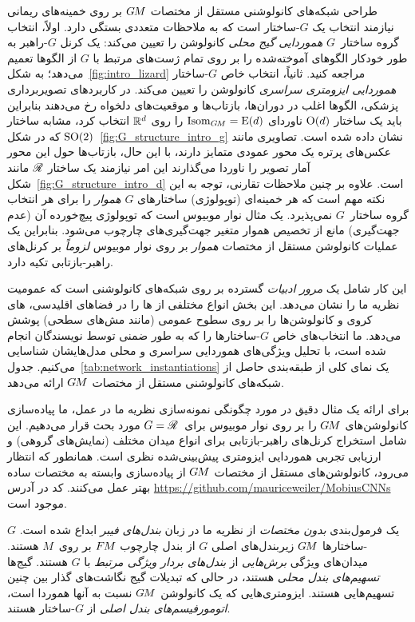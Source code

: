 طراحی شبکه‌های کانولوشنی مستقل از مختصات $G\mkern-1.4muM$ بر روی خمینه‌های ریمانی نیازمند انتخاب یک $G$-ساختار است که به ملاحظات متعددی بستگی دارد.
اولاً، انتخاب گروه ساختار~$G$ \emph{هموردایی گیج محلی} کانولوشن را تعیین می‌کند:
یک کرنل $G$-راهبر به طور خودکار الگوهای آموخته‌شده را بر روی تمام ژست‌های مرتبط با $G$ از الگوها تعمیم می‌دهد؛ به شکل~\ref{fig:intro_lizard} مراجعه کنید.
ثانیاً، انتخاب خاص $G$-ساختار \emph{هموردایی ایزومتری سراسری} کانولوشن را تعیین می‌کند.
در کاربردهای تصویربرداری پزشکی، الگوها اغلب در دوران‌ها، بازتاب‌ها و موقعیت‌های دلخواه رخ می‌دهند
بنابراین باید یک ساختار $\operatorname{O}(d)$ ناوردای $\operatorname{Isom}_{G\mkern-1.4muM} = \operatorname{E}(d)$ را روی $\mathbb{R}^d$ انتخاب کرد، مشابه ساختار $\operatorname{SO}(2)$ که در شکل~\ref{fig:G_structure_intro_g} نشان داده شده است.
تصاویری مانند عکس‌های پرتره یک محور عمودی متمایز دارند، با این حال، بازتاب‌ها حول این محور آمار تصویر را ناوردا می‌گذارند
این امر نیازمند یک ساختار $\mathscr{R}$ مانند شکل~\ref{fig:G_structure_intro_d} است.
علاوه بر چنین ملاحظات تقارنی، توجه به این نکته مهم است که هر خمینه‌ای (توپولوژی) ساختارهای $G$ \emph{هموار} را برای هر انتخاب گروه ساختار~$G$ نمی‌پذیرد.
یک مثال نوار موبیوس است که توپولوژی پیچ‌خورده آن (عدم جهت‌گیری) مانع از تخصیص هموار متغیر جهت‌گیری‌های چارچوب می‌شود.
بنابراین یک عملیات کانولوشن مستقل از مختصات \emph{هموار} بر روی نوار موبیوس \emph{لزوماً} بر کرنل‌های راهبر-بازتابی تکیه دارد.


این کار شامل یک \emph{مرور ادبیات} گسترده بر روی شبکه‌های کانولوشنی است که عمومیت نظریه ما را نشان می‌دهد.
این بخش انواع مختلفی از \CNN{}ها را در فضاهای اقلیدسی، \CNN{}های کروی و کانولوشن‌ها را بر روی سطوح عمومی (مانند مش‌های سطحی) پوشش می‌دهد.
ما انتخاب‌های خاص $G$-ساختارها را که به طور ضمنی توسط نویسندگان انجام شده است، با تحلیل ویژگی‌های هموردایی سراسری و محلی مدل‌هایشان شناسایی می‌کنیم.
جدول~\ref{tab:network_instantiations} یک نمای کلی از طبقه‌بندی حاصل از شبکه‌های کانولوشنی مستقل از مختصات $G\mkern-1.4muM$ ارائه می‌دهد.


برای ارائه یک مثال دقیق در مورد چگونگی نمونه‌سازی نظریه ما در عمل، ما پیاده‌سازی کانولوشن‌های $G\mkern-1.4muM$ را بر روی نوار موبیوس برای~$G=\mathscr{R}$ مورد بحث قرار می‌دهیم.
این شامل استخراج کرنل‌های راهبر-بازتابی برای انواع میدان مختلف (نمایش‌های گروهی) و ارزیابی تجربی هموردایی ایزومتری پیش‌بینی‌شده نظری است.
همانطور که انتظار می‌رود، کانولوشن‌های مستقل از مختصات $G\mkern-1.4muM$ از پیاده‌سازی وابسته به مختصات ساده بهتر عمل می‌کنند.
کد در آدرس \url{https://github.com/mauriceweiler/MobiusCNNs} موجود است.

یک فرمول‌بندی \emph{بدون مختصات} از نظریه ما در زبان \emph{بندل‌های فیبر} ابداع شده است.
$G$-ساختارها $G\mkern-1.4muM$ زیربندل‌های اصلی $G$ از بندل چارچوب $F\mkern-1.5muM$ بر روی~$M$ هستند.
میدان‌های ویژگی \emph{برش‌هایی} از \emph{بندل‌های بردار ویژگی مرتبط} با $G$ هستند.
گیج‌ها \emph{تسهیم‌های بندل محلی} هستند، در حالی که تبدیلات گیج نگاشت‌های گذار بین چنین تسهیم‌هایی هستند.
ایزومتری‌هایی که یک کانولوشن $G\mkern-1.4muM$ نسبت به آنها هموردا است، \emph{اتومورفیسم‌های بندل اصلی} از $G$-ساختار هستند.



